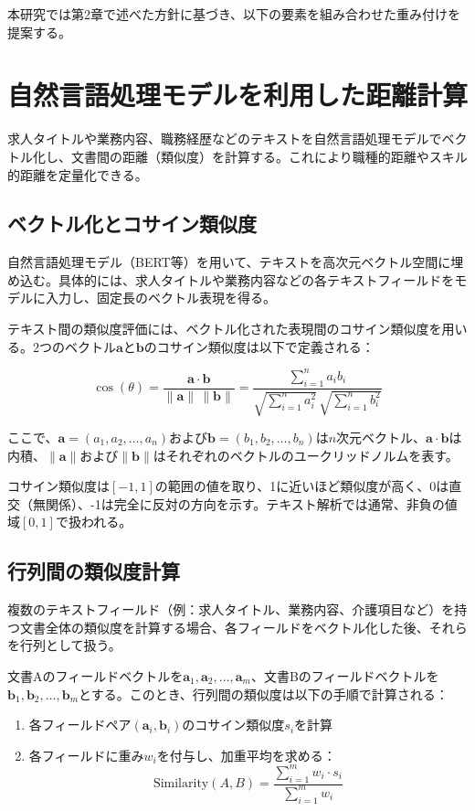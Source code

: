 本研究では第2章で述べた方針に基づき、以下の要素を組み合わせた重み付けを提案する。

\section{自然言語処理モデルを利用した距離計算}
求人タイトルや業務内容、職務経歴などのテキストを自然言語処理モデルでベクトル化し、文書間の距離（類似度）を計算する。これにより職種的距離やスキル的距離を定量化できる。

\subsection{ベクトル化とコサイン類似度}
自然言語処理モデル（BERT等）を用いて、テキストを高次元ベクトル空間に埋め込む。具体的には、求人タイトルや業務内容などの各テキストフィールドをモデルに入力し、固定長のベクトル表現を得る。

テキスト間の類似度評価には、ベクトル化された表現間のコサイン類似度を用いる。2つのベクトル\(\mathbf{a}\)と\(\mathbf{b}\)のコサイン類似度は以下で定義される：

\[
\cos(\theta)=\frac{\mathbf{a}\cdot\mathbf{b}}{\|\mathbf{a}\|\,\|\mathbf{b}\|}=\frac{\sum_{i=1}^{n} a_i b_i}{\sqrt{\sum_{i=1}^{n} a_i^2}\,\sqrt{\sum_{i=1}^{n} b_i^2}}
\]

ここで、\(\mathbf{a}=(a_1, a_2, \ldots, a_n)\)および\(\mathbf{b}=(b_1, b_2, \ldots, b_n)\)は\(n\)次元ベクトル、\(\mathbf{a}\cdot\mathbf{b}\)は内積、\(\|\mathbf{a}\|\)および\(\|\mathbf{b}\|\)はそれぞれのベクトルのユークリッドノルムを表す。

コサイン類似度は\([-1, 1]\)の範囲の値を取り、1に近いほど類似度が高く、0は直交（無関係）、-1は完全に反対の方向を示す。テキスト解析では通常、非負の値域\([0, 1]\)で扱われる。

\subsection{行列間の類似度計算}
複数のテキストフィールド（例：求人タイトル、業務内容、介護項目など）を持つ文書全体の類似度を計算する場合、各フィールドをベクトル化した後、それらを行列として扱う。

文書Aのフィールドベクトルを\(\mathbf{a}_1, \mathbf{a}_2, \ldots, \mathbf{a}_m\)、文書Bのフィールドベクトルを\(\mathbf{b}_1, \mathbf{b}_2, \ldots, \mathbf{b}_m\)とする。このとき、行列間の類似度は以下の手順で計算される：

\begin{enumerate}
\item 各フィールドペア\((\mathbf{a}_i, \mathbf{b}_i)\)のコサイン類似度\(s_i\)を計算
\item 各フィールドに重み\(w_i\)を付与し、加重平均を求める：
\[
\text{Similarity}(A, B) = \frac{\sum_{i=1}^{m} w_i \cdot s_i}{\sum_{i=1}^{m} w_i}
\]
\end{enumerate}

